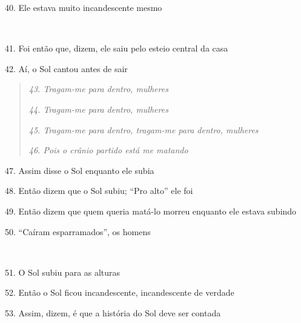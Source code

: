 40. Ele estava muito incandescente mesmo

~

41. Foi então que, dizem, ele saiu pelo esteio central da casa

42. Aí, o Sol cantou antes de sair

\begin{quote}
\forceindent\emph{43. Tragam-me para dentro, mulheres}

\emph{44. Tragam-me para dentro, mulheres}

\emph{45. Tragam-me para dentro, tragam-me para dentro, mulheres}

\emph{46. Pois o crânio partido está me matando}
\end{quote}

47. Assim disse o Sol enquanto ele subia

48. Então dizem que o Sol subiu; ``Pro alto'' ele foi

49. Então dizem que quem queria matá-lo morreu enquanto ele estava subindo

50. ``Caíram esparramados'', os homens

~

51. O Sol subiu para as alturas

52. Então o Sol ficou incandescente, incandescente de verdade

53. Assim, dizem, é que a história do Sol deve ser contada



